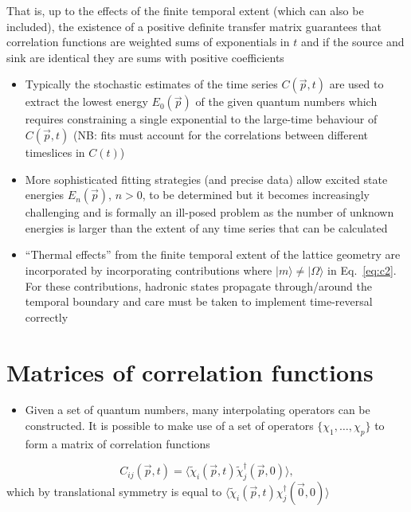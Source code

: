 That is, up to the effects of the finite temporal extent (which can also be included), the existence of a positive definite transfer matrix guarantees that correlation functions are weighted sums of exponentials in $t$ and if the source and sink are identical they are sums with positive coefficients

\begin{itemize}
    \item Typically the stochastic estimates of the time series $C(\vec{p}, t)$ are used to extract the lowest energy $E_0(\vec{p})$ of the given quantum numbers which requires constraining a single exponential to the large-time behaviour of $C(\vec{p},t)$ (NB: fits must account for the correlations between different timeslices in $C(t)$)
    \item More sophisticated fitting strategies (and precise data) allow excited state energies $E_n(\vec{p})$, $n> 0$, to be determined but it becomes increasingly challenging and is formally an ill-posed problem as the number of unknown energies is larger than the extent of any time series that can be calculated
    \item ``Thermal effects'' from the finite temporal extent of the lattice geometry are incorporated by incorporating contributions where $|m \rangle \neq | \Omega \rangle$ in Eq.~\eqref{eq:c2}. For these contributions, hadronic states propagate through/around the temporal boundary and care must be taken to implement time-reversal correctly
\end{itemize}

\section{Matrices of correlation functions}
\begin{itemize}
    \item Given a set of quantum numbers, many interpolating operators can be constructed. It is possible to make use of a set of operators $\{\chi_1, \ldots, \chi_p \}$ to form a matrix of correlation functions
\end{itemize}
\begin{equation}
    C_{ij}(\vec{p}, t) = \langle \tilde{\chi}_i(\vec{p}, t) \tilde{\chi}^\dagger_j(\vec{p}, 0) \rangle,
\end{equation}
which by translational symmetry is equal to $\langle \tilde{\chi}_i(\vec{p}, t) \chi^\dagger_j(\vec{0}, 0) \rangle$

